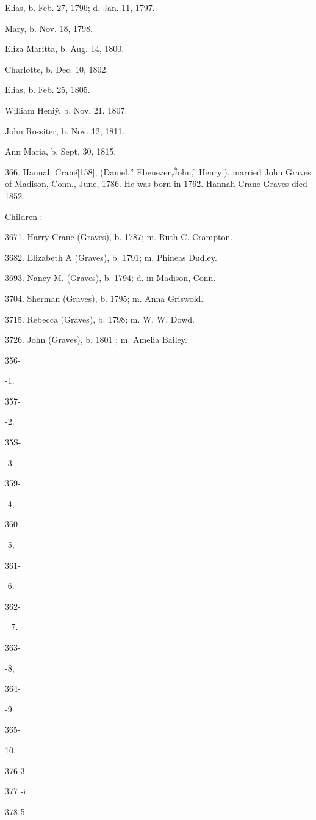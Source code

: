 Elias, b. Feb. 27, 1796; d. Jan. 11, 1797. 

Mary, b. Nov. 18, 1798. 

Eliza Maritta, b. Aug. 14, 1800. 

Charlotte, b. Dec. 10, 1802. 

Elias, b. Feb. 25, 1805. 

William Heni\^y, b. Nov. 21, 1807. 

John Rossiter, b. Nov. 12, 1811. 

Ann Maria, b. Sept. 30, 1815. 

366. Hannah Crane\^ [158], (Daniel,'' Ebeuezer,\^ John,\^ ' 
Henryi), married John Graves of Madison, Conn., June, 1786. 
He was born in 1762. Hannah Crane Graves died 1852. 

Children : 

3671. Harry Crane (Graves), b. 1787; m. Ruth C. Crampton. 

3682. Elizabeth A (Graves), b. 1791; m. Phineas Dudley. 

3693. Nancy M. (Graves), b. 1794; d. in Madison, Conn. 

3704. Sherman (Graves), b. 1795; m. Anna Griswold. 

3715. Rebecca (Graves), b. 1798; m. W. W. Dowd. 

3726. John (Graves), b. 1801 ; m. Amelia Bailey. 



356- 


-1. 


357- 


-2. 


35S- 


-3. 


359- 


-4, 


360- 


-5, 


361- 


-6. 


362- 


\_7. 


363- 


-8, 


364- 


-9. 


365- 


10. 



376 3 

377 -i 

378 5 

